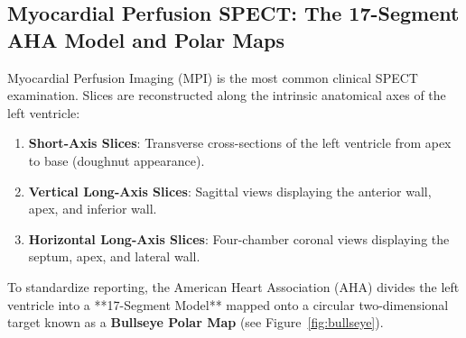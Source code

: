 \documentclass[11pt,a4paper]{article}
\begin{document}
\subsection{Myocardial Perfusion SPECT: The 17-Segment AHA Model and Polar Maps}
Myocardial Perfusion Imaging (MPI) is the most common clinical SPECT examination. Slices are reconstructed along the intrinsic anatomical axes of the left ventricle:
\begin{enumerate}
    \item \textbf{Short-Axis Slices}: Transverse cross-sections of the left ventricle from apex to base (doughnut appearance).
    \item \textbf{Vertical Long-Axis Slices}: Sagittal views displaying the anterior wall, apex, and inferior wall.
    \item \textbf{Horizontal Long-Axis Slices}: Four-chamber coronal views displaying the septum, apex, and lateral wall.
\end{enumerate}

To standardize reporting, the American Heart Association (AHA) divides the left ventricle into a **17-Segment Model** mapped onto a circular two-dimensional target known as a \textbf{Bullseye Polar Map} (see Figure~\ref{fig:bullseye}).
\end{document}
